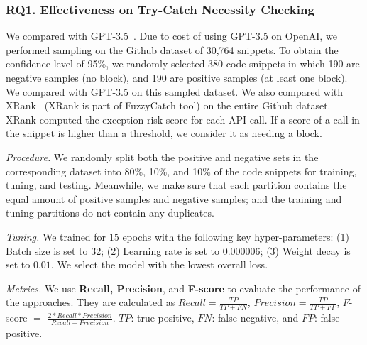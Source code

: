 \subsubsection{RQ1. Effectiveness on Try-Catch Necessity Checking}

 We compared {\xblock} with
GPT-3.5~\cite{tien}. Due to cost of using GPT-3.5 on OpenAI, we performed
sampling on the Github dataset of 30,764 snippets. To obtain the
confidence level of 95\%, we randomly selected 380 code snippets in
which 190 are negative samples (no  block), and 190
are positive samples (at least one  block). We
compared with GPT-3.5 on this sampled dataset.
We also compared {\xblock} with XRank~\cite{xrank-fse20} (XRank is
part of FuzzyCatch tool) on the entire Github dataset. XRank computed
the exception risk score for each API call. If a score of a call in
the snippet is higher than a threshold, we consider it as needing a
 block.

{\em Procedure.} We randomly split both the positive and negative sets
in the corresponding dataset into 80\%, 10\%, and 10\% of the code
snippets for training, tuning, and testing. Meanwhile, we make sure
that each partition contains the equal amount of positive samples and
negative samples; and the training and tuning partitions do not
contain any duplicates. 



{\em Tuning.} We trained {\tool} for $15$ epochs with the following key hyper-parameters: (1) Batch size is set to $32$; (2) Learning rate is set to $0.000006$; (3) Weight decay is set to $0.01$. We select the model with the lowest overall loss. 


{\em Metrics.} We use \textbf{Recall, Precision}, and {\bf F-score} to
evaluate the performance of the approaches. They are calculated as
$Recall = \frac{TP}{TP+FN}$, $Precision = \frac{TP}{TP+FP}$, $F$-score
$=$ $\frac{2*Recall*Precision}{Recall+Precision}$. $TP$: true
positive, $FN$: false negative, and $FP$: false positive.
